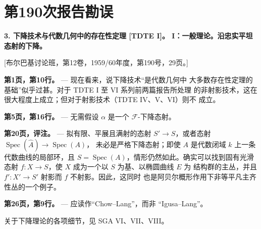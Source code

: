 \clearpage
\chapter*{第190次报告勘误}
\setcounter{footnote}{0}

\noindent\textbf{3. 下降技术与代数几何中的存在性定理 [TDTE I]。
I：一般理论。沿忠实平坦态射的下降。}

\begin{center}
[布尔巴基讨论班，第12卷，1959/60年度，第190号，29页。]
\end{center}

\noindent\textbf{第1页，第10行。} --- 现在看来，说下降技术“是代数几何中
大多数存在性定理的基础”似乎过甚。对于 TDTE I 至 VI 系列前两篇报告所处理
的非射影技术，这在很大程度上成立；但对于射影技术（TDTE IV、V、VI）则不
成立。

\noindent\textbf{第5页，第16行。} --- 无需假设 $\alpha$ 是一个
$\mathcal F$-下降态射。

\noindent\textbf{第20页，评注。} --- 拟有限、平展且满射的态射
$S'\longrightarrow S$，或者态射
$\operatorname{Spec}(\widehat A)\longrightarrow\operatorname{Spec}(A)$，
未必是严格下降态射；即使 $A$ 是代数闭域 $k$ 上一条代数曲线的局部环，且
$S=\operatorname{Spec}(A)$，情形仍然如此。确实可以找到固有光滑态射
$f:X\longrightarrow S$，使 $X$ 成为一个以 $S$ 为基、以椭圆曲线 $E$ 为
结构群的主丛，并且 $f':X'\longrightarrow S'$ 射影而 $f$ 不射影。因此，这同时
也是阿贝尔概形作用下非等平凡主齐性丛的一个例子。

\noindent\textbf{第26页，第9行。} --- 应读作“Chow--Lang”，而非
“Igusa--Lang”。

关于下降理论的各项细节，见 SGA VI、VII、VIII。

